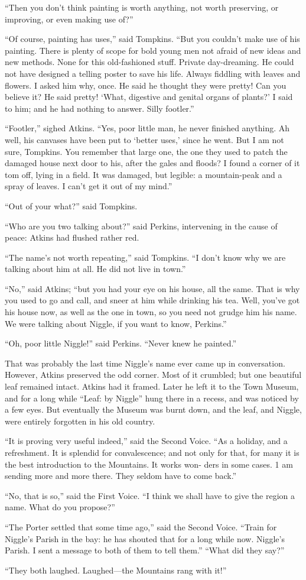 \documentclass[english]{scrartcl}
\begin{document}
“Then you don’t think painting is worth anything, not worth preserving, or improving, or even making use of?”

“Of course, painting has uses,” said Tompkins. “But you couldn’t make use of his painting. There is plenty of scope for bold young men not afraid of new ideas and new methods. None for this old-fashioned stuff. Private day-dreaming. He could not have designed a telling poster to save his life. Always fiddling with leaves and flowers. I asked him why, once. He said he thought they were pretty! Can you believe it? He said pretty! ‘What, digestive and genital organs of plants?’ I said to him; and he had nothing to answer. Silly footler.”

“Footler,” sighed Atkins. “Yes, poor little man, he never finished anything. Ah well, his canvases have been put to ‘better uses,’ since he went. But I am not sure, Tompkins. You remember that large one, the one they used to patch the damaged house next door to his, after the gales and floods? I found a corner of it tom off, lying in a field. It was damaged, but legible: a mountain-peak and a spray of leaves. I can’t get it out of my mind.”

“Out of your what?” said Tompkins.

“Who are you two talking about?” said Perkins, intervening in the cause of peace: Atkins had flushed rather red.

“The name’s not worth repeating,” said Tompkins. “I don’t know why we are talking about him at all. He did not live in town.”

“No,” said Atkins; “but you had your eye on his house, all the same. That is why you used to go and call, and sneer at him while drinking his tea. Well, you’ve got his house now, as well as the one in town, so you need not grudge him his name. We were talking about Niggle, if you want to know, Perkins.”

“Oh, poor little Niggle!” said Perkins. “Never knew he painted.”

That was probably the last time Niggle’s name ever came up in conversation. However, Atkins preserved the odd corner. Most of it crumbled; but one beautiful leaf remained intact. Atkins had it framed. Later he left it to the Town Museum, and for a long while “Leaf: by Niggle” hung there in a recess, and was noticed by a few eyes. But eventually the Museum was burnt down, and the leaf, and Niggle, were entirely forgotten in his old country.

“It is proving very useful indeed,” said the Second Voice. “As a holiday, and a refreshment. It is splendid for convalescence; and not only for that, for many it is the best introduction to the Mountains. It works won- ders in some cases. 1 am sending more and more there. They seldom have to come back.”

“No, that is so,” said the First Voice. “I think we shall have to give the region a name. What do you propose?”

“The Porter settled that some time ago,” said the Second Voice. “Train for Niggle’s Parish in the bay: he has shouted that for a long while now. Niggle’s Parish. I sent a message to both of them to tell them.” “What did they say?”

“They both laughed. Laughed—the Mountains rang with it!”
\end{document}
